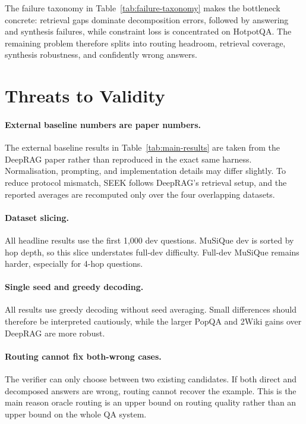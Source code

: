 The failure taxonomy in Table~\ref{tab:failure-taxonomy} makes the bottleneck concrete: retrieval gaps dominate decomposition errors, followed by answering and synthesis failures, while constraint loss is concentrated on HotpotQA. The remaining problem therefore splits into routing headroom, retrieval coverage, synthesis robustness, and confidently wrong answers.

\section{Threats to Validity}
\label{sec:threats}

\paragraph{External baseline numbers are paper numbers.} The external baseline results in Table~\ref{tab:main-results} are taken from the DeepRAG paper rather than reproduced in the exact same harness. Normalisation, prompting, and implementation details may differ slightly. To reduce protocol mismatch, SEEK follows DeepRAG's retrieval setup, and the reported averages are recomputed only over the four overlapping datasets.

\paragraph{Dataset slicing.} All headline results use the first 1{,}000 dev questions. MuSiQue dev is sorted by hop depth, so this slice understates full-dev difficulty. Full-dev MuSiQue remains harder, especially for 4-hop questions.

\paragraph{Single seed and greedy decoding.} All results use greedy decoding without seed averaging. Small differences should therefore be interpreted cautiously, while the larger PopQA and 2Wiki gains over DeepRAG are more robust.

\paragraph{Routing cannot fix both-wrong cases.} The verifier can only choose between two existing candidates. If both direct and decomposed answers are wrong, routing cannot recover the example. This is the main reason oracle routing is an upper bound on routing quality rather than an upper bound on the whole QA system.
